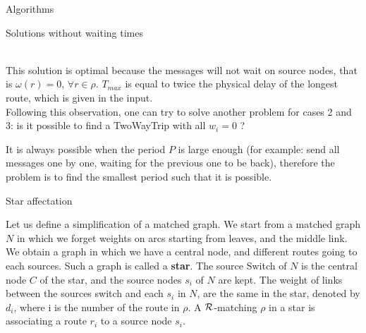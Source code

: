 \documentclass[a4paper,10pt]{report}
\begin{document}
\begin{chapter}{Algorithms}
\begin{section}{Solutions without waiting times}
{{{
 }}}\\

This solution is optimal because the messages will not wait on source nodes, that is $\omega(r) = 0$, $\forall r \in \rho$. $T_{max}$ is
equal to twice the physical delay of the longest route, which is given in the input.\\


Following this observation, one can try to solve another problem for cases 2 and 3: is it possible to find a TwoWayTrip
with all $w_i = 0$ ? 

It is always possible when the period $P$ is large enough (for example: send all messages one by one, waiting for the previous one to be back),
therefore the problem is to find the smallest period such that it is possible.

\begin{subsection}{Star affectation}
 
Let us define a simplification of a matched graph. 
We start from a matched graph $N$ in which we forget weights on arcs starting from leaves, and the middle link.
We obtain a graph in which we have a central node, and different routes going to each sources.
Such a graph is called a {\bf star}.
The source Switch of $N$ is the central node $C$ of the star, and the source nodes $s_i$ of $N$ are kept. 
The weight of links between the sources switch and each $s_i$ in $N$, are the same in the star, denoted by $d_i$, where i is the number of the route in $\rho$. 
A ${\cal R}$-matching $\rho$ in a star is associating a route $r_i$ to a source node $s_i$.\\

\fbox{\parbox{11cm}{

\begin{center}


\end{center}}}
\end{subsection}
\end{section}
\end{chapter}
\end{document}
